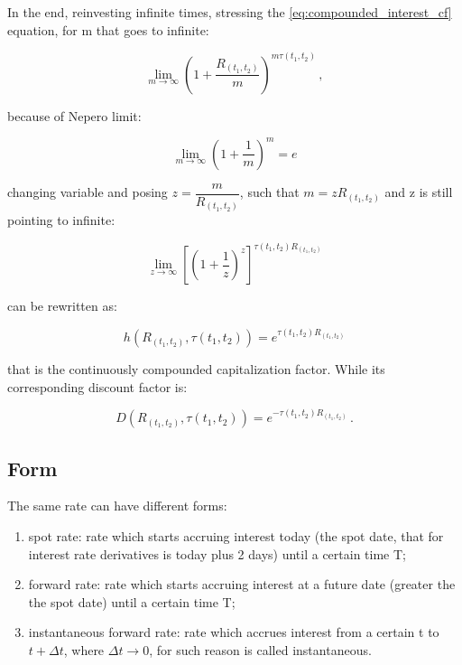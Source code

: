 In the end, reinvesting infinite times, stressing the \eqref{eq:compounded_interest_cf} equation, for m that goes to infinite:

\begin{equation*}
  \lim_{m \to \infty}\left(1+ \dfrac{R_{(t_{1},t_{2})}}{m}\right)^{m \tau(t_{1},t_{2})}\,,
\end{equation*}

because of Nepero limit:

\begin{equation*}
  \lim_{m \to \infty}\left(1+ \dfrac{1}{m}\right)^{m}= e
\end{equation*}

changing variable and posing $z=\dfrac{m}{R_{(t_{1},t_{2})}}$, such that $m=z R_{(t_{1},t_{2})}$  and z is still pointing to infinite:

\begin{equation*}
  \lim_{z \to \infty}\left[\left(1+ \dfrac{1}{z}\right)^z\right]^{ \tau(t_{1},t_{2}) R_{(t_{1},t_{2})}}
\end{equation*}

can be rewritten as:

\begin{equation}
   h(R_{(t_{1},t_{2})},\tau(t_{1},t_{2}))=e^{ \tau(t_{1},t_{2})R_{(t_{1},t_{2})}}
  \label{eq:cont_compounded_interest_cf}
\end{equation}

that is the continuously compounded capitalization factor. While its corresponding discount factor is:

\begin{equation}
  D(R_{(t_{1},t_{2})},\tau(t_{1},t_{2}))=e^{- \tau(t_{1},t_{2})R_{(t_{1},t_{2})}}\,.
  \label{eq:cont_compounded_interest_df}
\end{equation}

\subsection{Form} 

The same rate can have different forms:

\begin{enumerate}
    \item spot rate: rate which starts accruing interest today (the spot date, that for interest rate derivatives is today plus 2 days) until a certain time T;
    \item forward rate: rate which starts accruing interest at a future date (greater the the spot date) until a certain time T;
    \item instantaneous forward rate: rate which accrues interest from a certain t to $t+ \Delta t$, where $\Delta t \to 0$, for such reason is called instantaneous.
\end{enumerate}

